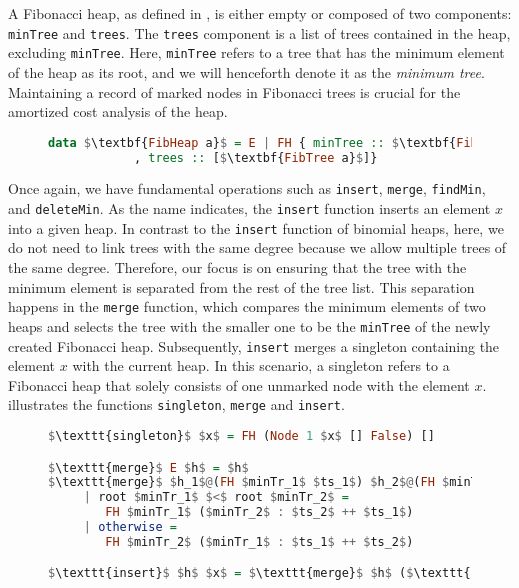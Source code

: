 \documentclass{clmthesis}
\begin{document}
A Fibonacci heap, as defined in , is either empty or composed of two components: \lstinline{minTree} and \lstinline{trees}. The \lstinline{trees} component is a list of trees contained in the heap, excluding \lstinline{minTree}. Here, \lstinline{minTree} refers to a tree that has the minimum element of the heap as its root, and we will henceforth denote it as the \emph{minimum tree}. Maintaining a record of marked nodes in Fibonacci trees is crucial for the amortized cost analysis of the heap.

\begin{figure}[h]
\begin{lstlisting}[mathescape=true, language=haskell, caption={Refinement of the data structure \textbf{FibHeap a}.},captionpos=b, label=fig:fibheap]
data $\textbf{FibHeap a}$ = E | FH { minTree :: $\textbf{FibTree a}$
			, trees :: [$\textbf{FibTree a}$]}	
\end{lstlisting}
\end{figure}

Once again, we have fundamental operations such as \texttt{insert}, \texttt{merge}, \texttt{findMin}, and \texttt{deleteMin}.
As the name indicates, the \texttt{insert} function inserts an element $x$ into a given heap. In contrast to the \texttt{insert} function of binomial heaps, here, we do not need to link trees with the same degree because we allow multiple trees of the same degree. Therefore, our focus is on ensuring that the tree with the minimum element is separated from the rest of the tree list. This separation happens in the \texttt{merge} function, which compares the minimum elements of two heaps and selects the tree with the smaller one to be the \lstinline{minTree} of the newly created Fibonacci heap. Subsequently, \texttt{insert} merges a singleton containing the element $x$ with the current heap. In this scenario, a singleton refers to a Fibonacci heap that solely consists of one unmarked node with the element $x$.  illustrates the functions \texttt{singleton}, \texttt{merge} and \texttt{insert}.

\begin{figure}[h]
\begin{lstlisting}[mathescape=true, language=haskell, caption={Singleton, merge and insert functions.},captionpos=b, label=fig:Fcode1]
$\texttt{singleton}$ $x$ = FH (Node 1 $x$ [] False) []

$\texttt{merge}$ E $h$ = $h$
$\texttt{merge}$ $h_1$@(FH $minTr_1$ $ts_1$) $h_2$@(FH $minTr_2$ $ts_2$)
     | root $minTr_1$ $<$ root $minTr_2$ = 
     	FH $minTr_1$ ($minTr_2$ : $ts_2$ ++ $ts_1$)
     | otherwise = 
     	FH $minTr_2$ ($minTr_1$ : $ts_1$ ++ $ts_2$)

$\texttt{insert}$ $h$ $x$ = $\texttt{merge}$ $h$ ($\texttt{singleton}$ $x$)
\end{lstlisting}
\end{figure}
\end{document}
